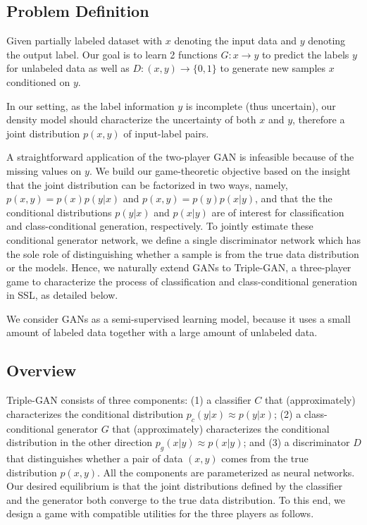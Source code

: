\documentclass[conference]{IEEEtran}
\begin{document}
\subsection{Problem Definition}

Given partially labeled dataset with $x$ denoting the input data and $y$ denoting the output label. Our goal is to learn 2 functions $G : x \rightarrow y$ to predict the labels $y$ for unlabeled data as well as $D : (x, y) \rightarrow \{0, 1\}$ to generate new samples $x$ conditioned on $y$. 

In our setting, as the label information $y$ is incomplete (thus uncertain), our density model should characterize the uncertainty of both $x$ and $y$, therefore a joint distribution $p(x, y)$ of input-label pairs.

A straightforward application of the two-player GAN is infeasible because of the missing values on $y$. We build our game-theoretic objective based on the insight that the joint distribution can be factorized in two ways, namely, $p(x, y) = p(x)p(y|x)$ and $p(x, y) = p(y)p(x|y)$, and that the the conditional distributions $p(y|x)$ and $p(x|y)$ are of interest for classification and class-conditional generation, respectively. To jointly estimate these conditional generator network, we define a single discriminator network which has the sole role of distinguishing whether a sample is from the true data distribution or the models. Hence, we naturally extend GANs to Triple-GAN, a three-player game to characterize the process of classification and class-conditional generation in SSL, as detailed below. 

We consider GANs as a semi-supervised learning model, because it uses a small amount of labeled data together with a large amount of unlabeled data. %

\subsection{Overview}

Triple-GAN consists of three components: (1) a classifier $C$ that (approximately) characterizes the conditional distribution $p_c(y|x) \approx p(y|x)$; (2) a class-conditional generator $G$ that (approximately) characterizes the conditional distribution in the other direction $p_g(x|y) \approx p(x|y)$; and (3) a discriminator $D$ that distinguishes whether a pair of data $(x, y)$ comes from the true distribution $p(x, y)$. All the components are parameterized as neural networks. Our desired equilibrium is that the joint distributions defined by the classifier and the generator both converge to the true data distribution. To this end, we design a game with compatible utilities for the three players as follows. 
\end{document}
